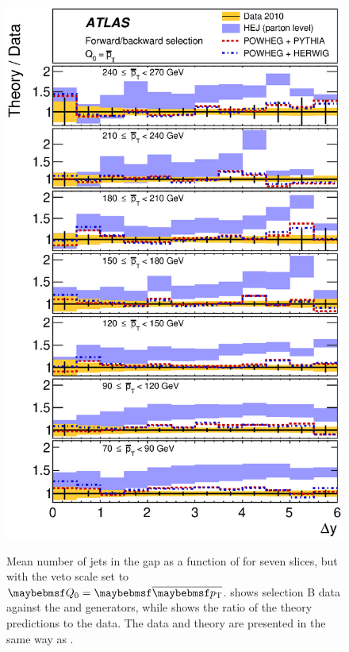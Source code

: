 \begin{figure}[htpb]
{    \includegraphics[width=\smallfigwidth]{chapters/gbj/Njet_YDist_gap_ptbar_sel_B_Ratio.eps}
    \label{fig:gbj:N_jets_dY_Bp_ratio}}
  \caption{Mean number of jets in the gap as a function of \DeltaY for seven \pTbar
           slices, but with the veto scale set to $\Qnought = \pTbar$. \protect{}
           shows selection B data against the \HEJ and \Powheg generators, while \protect{}
           shows the ratio of the theory predictions to the data. The data and theory
           are presented in the same way as .}
  \label{fig:gbj:N_jets_dY_Bp}
\end{figure}

